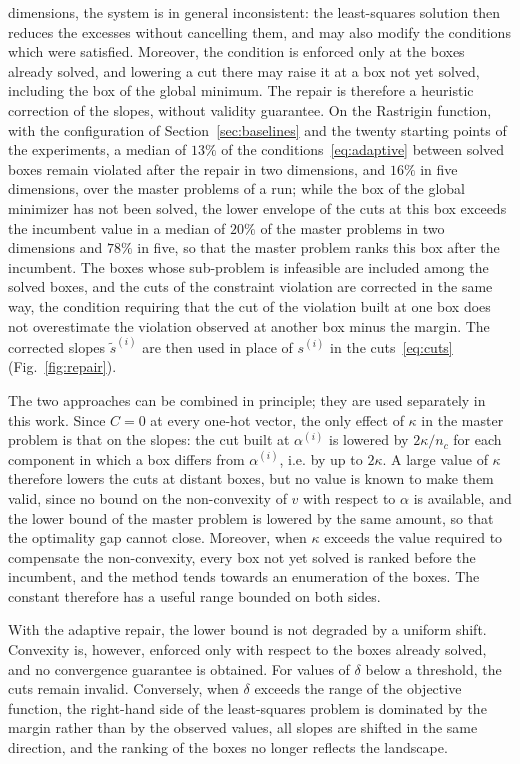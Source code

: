 \documentclass[pdflatex,sn-basic]{sn-jnl}
\begin{document}
dimensions, the system is in general inconsistent: the least-squares solution
then reduces the excesses without cancelling them, and may also modify the
conditions which were satisfied. Moreover, the condition is enforced only at the
boxes already solved, and lowering a cut there may raise it at a box not yet
solved, including the box of the global minimum. The repair is therefore a
heuristic correction of the slopes, without validity guarantee. On the
Rastrigin function, with the configuration of Section~\ref{sec:baselines} and
the twenty starting points of the experiments, a median of $13\%$ of the
conditions~\eqref{eq:adaptive} between solved boxes remain violated after the
repair in two dimensions, and $16\%$ in five dimensions, over the master
problems of a run; while the box of the global minimizer has not been solved,
the lower envelope of the cuts at this box exceeds the incumbent value in a
median of $20\%$ of the master problems in two dimensions and $78\%$ in five,
so that the master problem ranks this box after the incumbent. The boxes whose
sub-problem is infeasible are included among the solved boxes, and the cuts of
the constraint violation are corrected in the same way, the condition requiring
that the cut of the violation built at one box does not overestimate the
violation observed at another box minus the margin.
The corrected slopes $\tilde s^{(i)}$ are then used in place of $s^{(i)}$ in the
cuts~\eqref{eq:cuts} (Fig.~\ref{fig:repair}).

The two approaches can be combined in principle; they are used separately in
this work. Since $C = 0$ at every one-hot vector, the only effect of $\kappa$
in the master problem is that on the slopes: the cut built at $\alpha^{(i)}$ is
lowered by $2\kappa/n_c$ for each component in which a box differs from
$\alpha^{(i)}$, i.e. by up to $2\kappa$. A large value of $\kappa$ therefore
lowers the cuts at distant boxes, but no value is known to make them valid,
since no bound on the non-convexity of $v$ with respect to $\alpha$ is
available, and the lower bound of the master problem is lowered by the same
amount, so that the optimality gap cannot close. Moreover, when $\kappa$
exceeds the value required to compensate the non-convexity, every box not yet
solved is ranked before the incumbent, and the method tends towards an
enumeration of the boxes. The constant therefore has a useful range bounded on
both sides.

With the adaptive repair, the lower bound is not degraded by a uniform shift.
Convexity is, however, enforced only with respect to the boxes already solved,
and no convergence guarantee is obtained. For values of $\delta$ below a
threshold, the cuts remain invalid. Conversely, when $\delta$ exceeds the range
of the objective function, the right-hand side of the least-squares problem is
dominated by the margin rather than by the observed values, all slopes are
shifted in the same direction, and the ranking of the boxes no longer reflects
the landscape.
\end{document}

